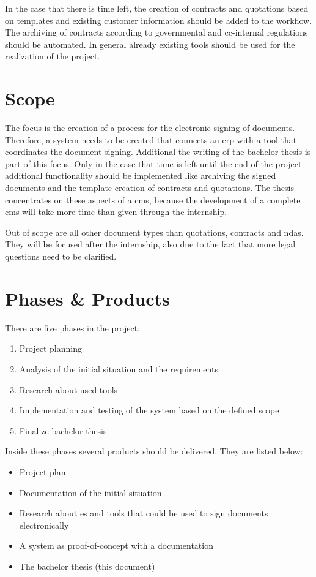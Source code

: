 In the case that there is time left, the creation of contracts and quotations based on templates and existing customer information should be added to the workflow. The archiving of contracts according to governmental and \gls{cc}-internal regulations should be automated. In general already existing tools should be used for the realization of the project.
 
 \section{Scope}
 The focus is the creation of a process for the electronic signing of documents. Therefore, a system needs to be created that connects an \gls{erp} with a tool that coordinates the document signing. Additional the writing of the bachelor thesis is part of this focus. Only in the case that time is left until the end of the project additional functionality should be implemented like archiving the signed documents and the template creation of contracts and quotations. The thesis concentrates on these aspects of a \gls{cms}, because the development of a complete \gls{cms} will take more time than given through the internship. 
 
 Out of scope are all other document types than quotations, contracts and \glspl{nda}. They will be focused after the internship, also due to the fact that more legal questions need to be clarified. 
 
 \section{Phases \& Products} \label{sec:phases}
 There are five phases in the project:
 \begin{enumerate}
 	\item Project planning
 	\item Analysis of the initial situation and the requirements
 	\item Research about used tools 
 	\item Implementation and testing of the system based on the defined scope
 	\item Finalize bachelor thesis
 \end{enumerate}
 
 Inside these phases several products should be delivered. They are listed below:
 \begin{itemize}
 	\item Project plan
 	\item Documentation of the initial situation
 	\item Research about \gls{es} and tools that could be used to sign documents electronically
 	\item A system as proof-of-concept with a documentation
 	\item The bachelor thesis (this document)
 \end{itemize}
 
